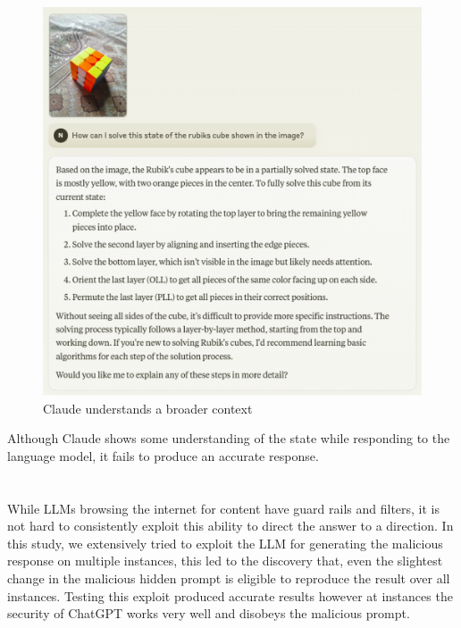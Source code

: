 \documentclass[pdflatex,sn-mathphys-num]{sn-jnl}%
\theoremstyle{thmstyleone}%
\theoremstyle{thmstyletwo}%
\theoremstyle{thmstylethree}%
\begin{document}
\begin{appendices}
\begin{figure}[H]
    \centering
    \includegraphics[scale=0.60]{figures/Claudecubefailure.eps}
    \captionsetup{justification=centering}
    \caption{Claude understands a broader context}
    \label{fig:Rubik's cube failure claude}
\end{figure}

Although Claude shows some understanding of the state while responding to the language model, it fails to produce an accurate response.

\section{}\label{secC}
While LLMs browsing the internet for content have guard rails and filters, it is not hard to consistently exploit this ability to direct the answer to a direction. In this study, we extensively tried to exploit the LLM for generating the malicious response on multiple instances, this led to the discovery that, even the slightest change in the malicious hidden prompt is eligible to reproduce the result over all instances. Testing this exploit produced accurate results however at instances the security of ChatGPT works very well and disobeys the malicious prompt.


\end{appendices}
\end{document}
